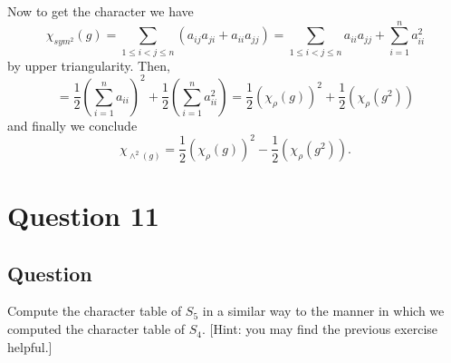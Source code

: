 \documentclass[11pt]{article}
\begin{document}
Now to get the character we have
\[\chi_{sym^2}(g) = \sum_{1 \leq i < j \leq n} (a_{ij}a_{ji}+a_{ii}a_{jj}) = \sum_{1 \leq i < j \leq n} a_{ii}a_{jj} + \sum_{i = 1} ^n a_{ii}^2\]
by upper triangularity. Then,
\[ = \frac{1}{2} ( \sum_{i=1}^n  a_{ii} ) ^2 + \frac{1}{2} \left( \sum_{i=1}^n a_{ii}^2 \right) = \frac{1}{2} ( \chi_\rho (g))^2 + \frac{1}{2} (\chi_\rho (g^2)) \]
and finally we conclude
\[\chi_{\wedge^2(g)} = \frac{1}{2} ( \chi_\rho(g))^2 - \frac{1}{2} (\chi_\rho(g^2)).\]
\section{Question 11}
\subsection{Question}
Compute the character table of $S_5$ in a similar way to the manner in which we computed the character table of $S_4$. [Hint: you may find the previous exercise helpful.]
\end{document}

